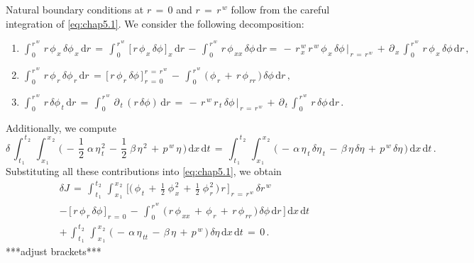 \documentclass[alpha-refs, 12pt]{wiley-article}
\begin{document}
Natural boundary conditions at $r\,=\,0$ and $r\,=\,r^{\,w}$ follow from the careful integration of \eqref{eq:chap5.1}. We consider the following decomposition:
\begin{enumerate}
\item $\int_{\,0}^{\,r^{\,w}}\,r\,\phi_{\,x}\,\delta \phi_{\,x}\,\mathrm{d}r\,=\,\int_{\,0}^{\,r^{\,w}}\,\bigl[\,r\,\phi_{\,x}\,\delta \phi\,\bigr]_{\,x}\,\mathrm{d}r\,-\,\int_{\,0}^{\,r^{\,w}}\,r\,\phi_{\,xx}\,\delta \phi\,\mathrm{d}r =\,-\,r_{\,x}^{\,w}\,r^{\,w}\,\phi_{\,x}\,\delta \phi\,\biggr|_{\,r\,=\,r^{\,w}}\,+\,\partial_{\,x}\,\int_{\,0}^{\,r^{\,w}}\,r\,\phi_{\,x}\,\delta \phi\,\mathrm{d}r\,,$
\item $\int_{\,0}^{\,r^{\,w}}\,r\,\phi_{\,r}\,\delta \phi_{\,r}\,\mathrm{d}r\,=\,\bigl[\,r\,\phi_{\,r}\,\delta \phi\,\bigr]_{\,r\,=\,0}^{\,r\,=\,r^{\,w}}\,-\,\int_{\,0}^{\,r^{\,w}}\,\bigl(\,\phi_{\,r}\,+\,r\,\phi_{\,rr}\,\bigr)\,\delta \phi\,\mathrm{d}r\,,$
\item $\int_{\,0}^{\,r^{\,w}}\,r\,\delta \phi_{\,t}\,\mathrm{d}r\,=\,\int_{\,0}^{\,r^{\,w}}\,\partial_{\,t}\,(r\,\delta \phi)\,\mathrm{d}r\,=\,-\,r^{\,w}\,r_{\,t}\,\delta \phi\,\biggr|_{\,r\,=\,r^{\,w}}\,+\,\partial_{\,t}\,\int_{\,0}^{\,r^{\,w}}\,r\,\delta \phi\,\mathrm{d}r\,.$
\end{enumerate}
Additionally, we compute
\begin{equation*}
  \delta\,\int_{\,t_{\,1}}^{\,t_{\,2}}\,\int_{\,x_{\,1}}^{\,x_{\,2}}\,\biggl(\,-\,\frac{1}{2}\;\alpha\,\eta_{\,t}^{\,2}\,-\,\frac{1}{2}\;\beta\,\eta^{\,2}\,+\,p^{\,w}\,\eta\,\biggr)\,\mathrm{d}x\,\mathrm{d}t\,=\,\int_{\,t_{\,1}}^{\,t_{\,2}}\,\int_{\,x_{\,1}}^{\,x_{\,2}}\,\bigl(\,-\,\alpha\,\eta_{\,t}\,\delta \eta_{\,t}\,-\,\beta\,\eta\,\delta \eta\,+\,p^{\,w}\,\delta \eta\,\bigr)\,\mathrm{d}x\,\mathrm{d}t\,.
\end{equation*}
Substituting all these contributions into \eqref{eq:chap5.1}, we obtain
\begin{multline*}
  \delta J\,=\,\int_{\,t_{\,1}}^{\,t_{\,2}}\,\int_{\,x_{\,1}}^{\,x_{\,2}}\,\Biggl[\biggl(\,\phi_{\,t}\,+\,\frac{1}{2}\;\phi_{\,x}^{\,2}\,+\,\frac{1}{2}\;\phi_{\,r}^{\,2}\,\biggr)\,r\,\Biggr]_{\,r\,=\,r^{\,w}}\,\delta r^{\,w} \\
  -\,\bigl[\,r\,\phi_{\,r}\,\delta \phi\,\bigr]_{\,r\,=\,0} \,-\,\int_{\,0}^{\,r^{\,w}}\,\bigl(\,r\,\phi_{\,xx}\,+\,\phi_{\,r}\,+\,r\,\phi_{\,rr}\,\bigr)\,\delta \phi\,\mathrm{d}r\,\Biggr]\,\mathrm{d}x\,\mathrm{d}t \\
  +\,\int_{\,t_{\,1}}^{\,t_{\,2}}\,\int_{\,x_{\,1}}^{\,x_{\,2}}\,\bigl(\,-\,\alpha\,\eta_{\,tt}\,-\,\beta\,\eta\,+\,p^{\,w}\,\bigr)\,\delta \eta\,\mathrm{d}x\,\mathrm{d}t\,=\,0\,.
\end{multline*}
{\color{red}***adjust brackets***}
\end{document}
